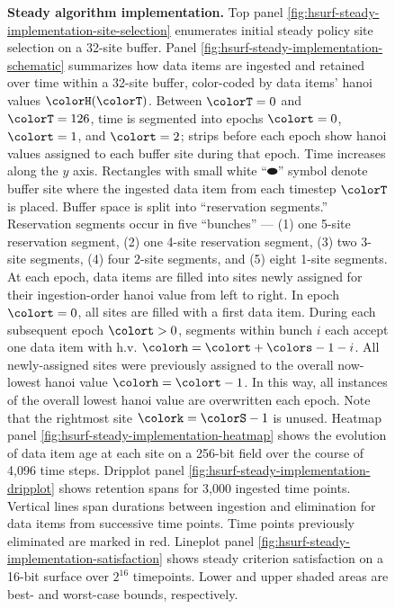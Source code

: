 \begin{figure}[htbp!]
\vspace{-2ex}\caption{%
  \textbf{Steady algorithm implementation.}
  \footnotesize
  Top panel \ref{fig:hsurf-steady-implementation-site-selection} enumerates initial steady policy site selection on a 32-site buffer.
  Panel \ref{fig:hsurf-steady-implementation-schematic} summarizes how data items are ingested and retained over time within a 32-site buffer, color-coded by data items' hanoi values $\colorH(\colorT)$.
  Between $\colorT=0$ and $\colorT=126$, time is segmented into epochs $\colort=0$, $\colort=1$, and $\colort=2$; strips before  each epoch show hanoi values assigned to each buffer site during that epoch.
  Time increases along the $y$ axis.
  Rectangles with small white ``$\blkhorzoval$'' symbol denote buffer site where the ingested data item from each timestep $\colorT$ is placed.
  Buffer space is split into ``reservation segments.''
  Reservation segments occur in five ``bunches'' --- (1) one 5-site reservation segment, (2) one 4-site reservation segment, (3) two 3-site segments, (4) four 2-site segments, and (5) eight 1-site segments.
  At each epoch, data items are filled into sites newly assigned for their ingestion-order hanoi value from left to right.
  In epoch $\colort=0$, all sites are filled with a first data item.
  During each subsequent epoch $\colort>0$, segments within bunch $i$ each accept one data item with h.v. $\colorh=\colort + \colors - 1 - i$.
  All newly-assigned sites were previously assigned to the overall now-lowest hanoi value $\colorh=\colort - 1$.
  In this way, all instances of the overall lowest hanoi value are overwritten each epoch.
  Note that the rightmost site $\colork=\colorS-1$ is unused.
  Heatmap panel \ref{fig:hsurf-steady-implementation-heatmap} shows the evolution of data item age at each site on a 256-bit field over the course of 4,096 time steps.
  Dripplot panel \ref{fig:hsurf-steady-implementation-dripplot} shows retention spans for 3,000 ingested time points.
  Vertical lines span durations between ingestion and elimination for data items from successive time points.
  Time points previously eliminated are marked in red.
  Lineplot panel \ref{fig:hsurf-steady-implementation-satisfaction} shows steady criterion satisfaction on a 16-bit surface over $2^{16}$ timepoints.
  Lower and upper shaded areas are best- and worst-case bounds, respectively.
  }
\label{fig:hsurf-steady-implementation}

\end{figure}
